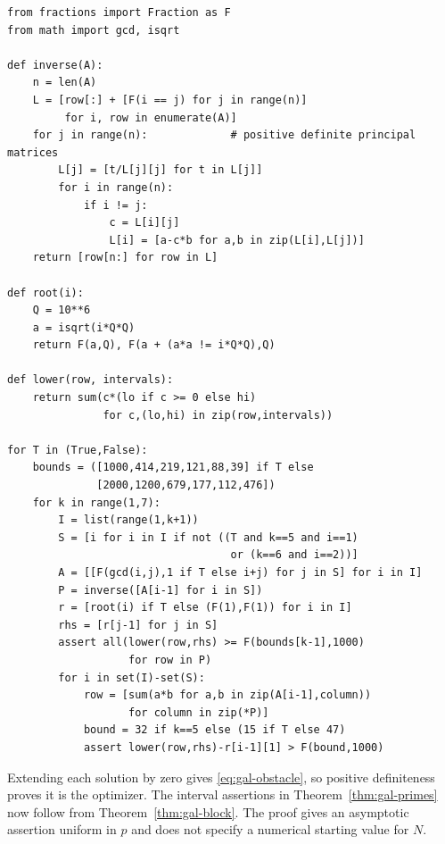\documentclass[11pt,a4paper]{article}
\begin{document}
\begin{verbatim}
from fractions import Fraction as F
from math import gcd, isqrt

def inverse(A):
    n = len(A)
    L = [row[:] + [F(i == j) for j in range(n)]
         for i, row in enumerate(A)]
    for j in range(n):             # positive definite principal matrices
        L[j] = [t/L[j][j] for t in L[j]]
        for i in range(n):
            if i != j:
                c = L[i][j]
                L[i] = [a-c*b for a,b in zip(L[i],L[j])]
    return [row[n:] for row in L]

def root(i):
    Q = 10**6
    a = isqrt(i*Q*Q)
    return F(a,Q), F(a + (a*a != i*Q*Q),Q)

def lower(row, intervals):
    return sum(c*(lo if c >= 0 else hi)
               for c,(lo,hi) in zip(row,intervals))

for T in (True,False):
    bounds = ([1000,414,219,121,88,39] if T else
              [2000,1200,679,177,112,476])
    for k in range(1,7):
        I = list(range(1,k+1))
        S = [i for i in I if not ((T and k==5 and i==1)
                                   or (k==6 and i==2))]
        A = [[F(gcd(i,j),1 if T else i+j) for j in S] for i in I]
        P = inverse([A[i-1] for i in S])
        r = [root(i) if T else (F(1),F(1)) for i in I]
        rhs = [r[j-1] for j in S]
        assert all(lower(row,rhs) >= F(bounds[k-1],1000)
                   for row in P)
        for i in set(I)-set(S):
            row = [sum(a*b for a,b in zip(A[i-1],column))
                   for column in zip(*P)]
            bound = 32 if k==5 else (15 if T else 47)
            assert lower(row,rhs)-r[i-1][1] > F(bound,1000)
\end{verbatim}
Extending each solution by zero gives \eqref{eq:gal-obstacle}, so positive definiteness proves it is the optimizer. The interval assertions in Theorem~\ref{thm:gal-primes} now follow from Theorem~\ref{thm:gal-block}. The proof gives an asymptotic assertion uniform in $p$ and does not specify a numerical starting value for $N$.
\end{document}

